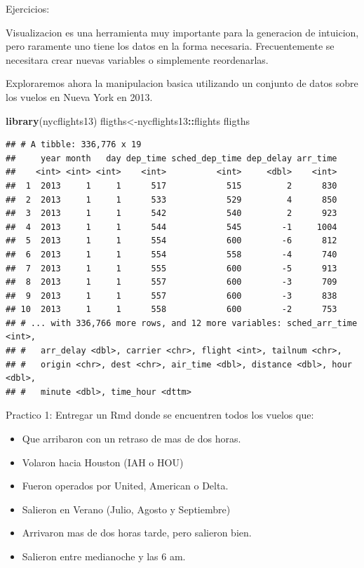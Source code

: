 \documentclass[ignorenonframetext,]{beamer}
\newenvironment{Shaded}{\begin{snugshade}}{\end{snugshade}}
\newcommand{\KeywordTok}[1]{\textcolor[rgb]{0.13,0.29,0.53}{\textbf{#1}}}
\newcommand{\OperatorTok}[1]{\textcolor[rgb]{0.81,0.36,0.00}{\textbf{#1}}}
\newcommand{\NormalTok}[1]{#1}
\providecommand{\tightlist}{%
  \setlength{\itemsep}{0pt}\setlength{\parskip}{0pt}}
\begin{document}
\begin{frame}[fragile]{Ejercicios:}

Visualizacion es una herramienta muy importante para la generacion de
intuicion, pero raramente uno tiene los datos en la forma necesaria.
Frecuentemente se necesitara crear nuevas variables o simplemente
reordenarlas.

Exploraremos ahora la manipulacion basica utilizando un conjunto de
datos sobre los vuelos en Nueva York en 2013.

\begin{Shaded}
\begin{Highlighting}[]
\KeywordTok{library}\NormalTok{(nycflights13)}
\NormalTok{fligths<-nycflights13}\OperatorTok{::}\NormalTok{flights}
\NormalTok{fligths}
\end{Highlighting}
\end{Shaded}

\begin{verbatim}
## # A tibble: 336,776 x 19
##     year month   day dep_time sched_dep_time dep_delay arr_time
##    <int> <int> <int>    <int>          <int>     <dbl>    <int>
##  1  2013     1     1      517            515         2      830
##  2  2013     1     1      533            529         4      850
##  3  2013     1     1      542            540         2      923
##  4  2013     1     1      544            545        -1     1004
##  5  2013     1     1      554            600        -6      812
##  6  2013     1     1      554            558        -4      740
##  7  2013     1     1      555            600        -5      913
##  8  2013     1     1      557            600        -3      709
##  9  2013     1     1      557            600        -3      838
## 10  2013     1     1      558            600        -2      753
## # ... with 336,766 more rows, and 12 more variables: sched_arr_time <int>,
## #   arr_delay <dbl>, carrier <chr>, flight <int>, tailnum <chr>,
## #   origin <chr>, dest <chr>, air_time <dbl>, distance <dbl>, hour <dbl>,
## #   minute <dbl>, time_hour <dttm>
\end{verbatim}

\end{frame}

\begin{frame}{Practico 1: Entregar un Rmd donde se encuentren todos los
vuelos que:}

\begin{itemize}
\tightlist
\item
  Que arribaron con un retraso de mas de dos horas.
\item
  Volaron hacia Houston (IAH o HOU)
\item
  Fueron operados por United, American o Delta.
\item
  Salieron en Verano (Julio, Agosto y Septiembre)
\item
  Arrivaron mas de dos horas tarde, pero salieron bien.
\item
  Salieron entre medianoche y las 6 am.
\end{itemize}

\end{frame}

\begin{frame}

\end{frame}
\end{document}
